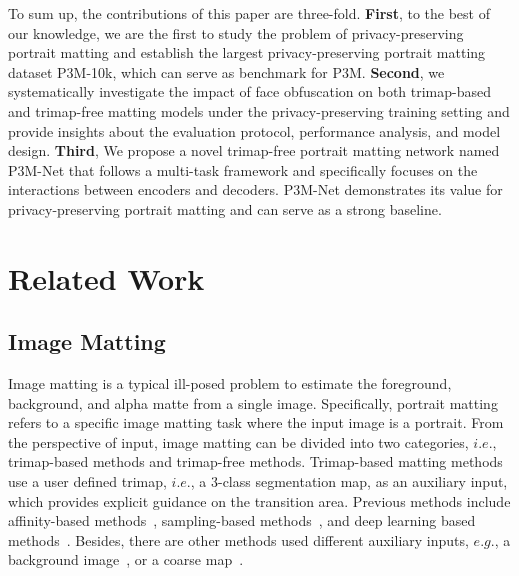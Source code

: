 \documentclass[sigconf]{acmart}
\begin{document}
To sum up, the contributions of this paper are three-fold. \textbf{First}, to the best of our knowledge, we are the first to study the problem of privacy-preserving portrait matting and establish the largest privacy-preserving portrait matting dataset P3M-10k, which can serve as benchmark for P3M. \textbf{Second}, we systematically investigate the impact of face obfuscation on both trimap-based and trimap-free matting models under the privacy-preserving training setting and provide insights about the evaluation protocol, performance analysis, and model design. \textbf{Third}, We propose a novel trimap-free portrait matting network named P3M-Net that follows a multi-task framework and specifically focuses on the interactions between encoders and decoders. P3M-Net demonstrates its value for privacy-preserving portrait matting and can serve as a strong baseline.



\section{Related Work}
\subsection{Image Matting}
Image matting is a typical ill-posed problem to estimate the foreground, background, and alpha matte from a single image. Specifically, portrait matting refers to a specific image matting task where the input image is a portrait. From the perspective of input, image matting can be divided into two categories, $i.e.$, trimap-based methods and trimap-free methods. Trimap-based matting methods use a user defined trimap, $i.e.$, a 3-class segmentation map, as an auxiliary input, which provides explicit guidance on the transition area. Previous methods include affinity-based methods~\cite{levin2007closed,aksoy2018semantic}, sampling-based methods~\cite{he2011global,shahrian2013improving}, and deep learning based methods~\cite{lu2019indices,hou2019context}. Besides, 
there are other methods used different auxiliary inputs, $e.g.$, a background image~\cite{backgroundmatting,backgroundmattingv2}, or a coarse map~\cite{yu2021mask}.
\end{document}
